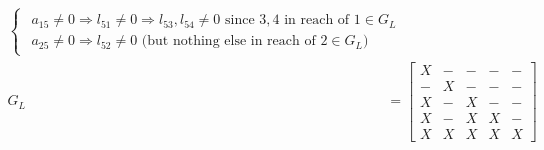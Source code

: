 \documentclass{article}
\begin{document}
\begin{align*}
\begin{cases}
        \begin{matrix}
            a_{15}\neq 0 \Rightarrow l_{51} \neq 0 \Longrightarrow l_{53}, l_{54} \neq 0 \textrm{ since $3,4$ in reach of $1 \in G_L$}\\
            a_{25}\neq 0 \Rightarrow l_{52} \neq 0 \textrm{ (but nothing else in reach of $2 \in G_L$)}
        \end{matrix}
    \end{cases}\\
    G_L &= \begin{bmatrix} X & - & -&-&-\\ - & X & -&-&-\\X & - & X &-&- \\
        X&-&X&X&-\\X&X&X&X&X\end{bmatrix}
\end{align*}
\end{document}
